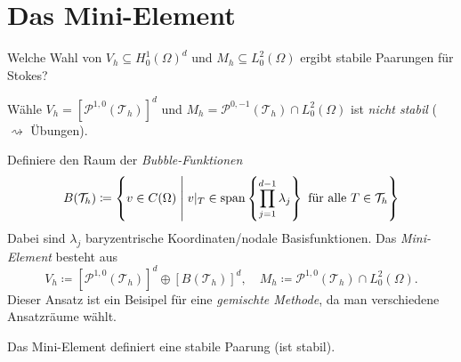 \documentclass[../skript.tex]{subfiles}
\begin{document}
\section{Das Mini-Element}\label{sec:c3e4}
Welche Wahl von $V_h\subseteq H^1_0(\Omega)^d$ und $M_h\subseteq L^2_0(\Omega)$ ergibt stabile Paarungen für Stokes?\newline\newline\noindent
\begin{example}\label{ex:c3e4s1}
	Wähle $V_h = \left[\mathcal{P}^{1,0}(\mathcal{T}_h)\right]^d$ und $M_h = \mathcal{P}^{0,-1}(\mathcal{T}_h)\cap L^2_0(\Omega)$
	ist \emph{nicht stabil} ($\rightsquigarrow$ Übungen).
\end{example}
\begin{definition}\label{def:c3e4s2}
	Definiere den Raum der \emph{Bubble-Funktionen}
	\[
		B(\mathcal{T}_h) \coloneqq \left\{ v\in C(\Omega) \mathrel{}\middle|\mathrel{} v|_T\in \operatorname*{span} \left\{ \prod_{j=1}^{d-1}\lambda_j \right\}\text{ für alle }T\in\mathcal{T}_h \right\}
	\]
	Dabei sind $\lambda_j$ baryzentrische Koordinaten\slash{}nodale Basisfunktionen.\newline\noindent
	Das \emph{Mini-Element} besteht aus
	\[
		V_h \coloneqq \left[ \mathcal{P}^{1,0}(\mathcal{T}_h) \right]^d \oplus \left[ B(\mathcal{T}_h) \right]^d,\quad M_h\coloneqq \mathcal{P}^{1,0}(\mathcal{T}_h)\cap L^2_0(\Omega).
	\]
	Dieser Ansatz ist ein Beisipel für eine \emph{gemischte Methode}, da man verschiedene Ansatzräume wählt.
\end{definition}

\begin{theorem}\label{thm:c3e4s3}
	Das Mini-Element definiert eine stabile Paarung (ist stabil).
\end{theorem}
\end{document}
